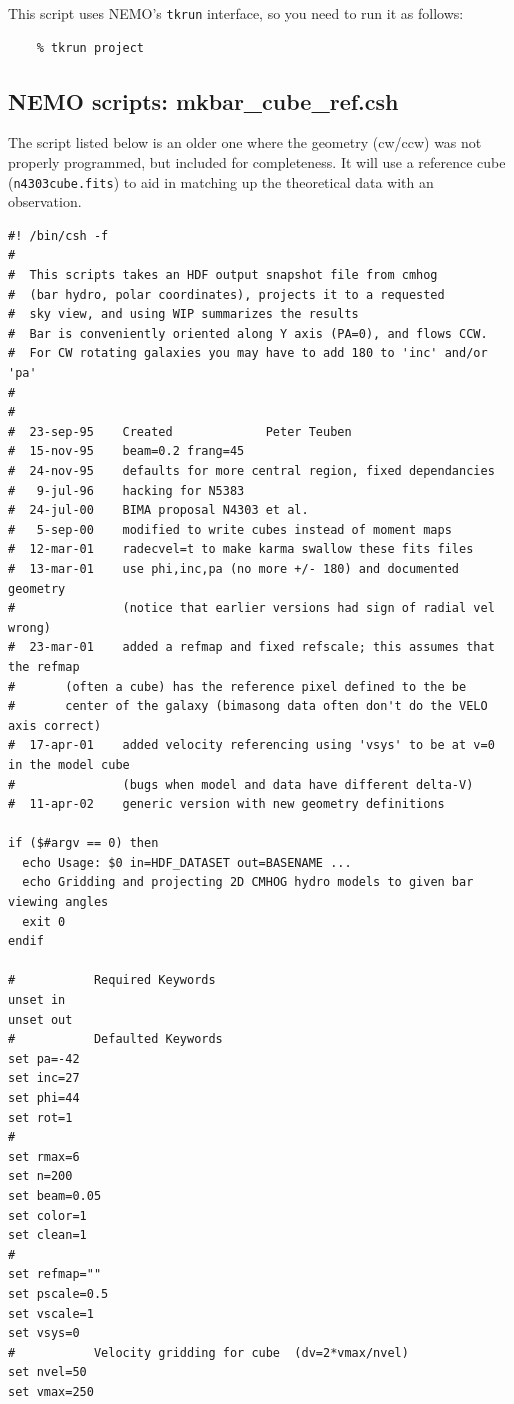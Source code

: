 \documentclass[10pt,dvips]{article}
\begin{document}
This script uses NEMO's {\tt tkrun} interface, so you need to run it
as follows:

\footnotesize\begin{verbatim}
    % tkrun project
\end{verbatim}\normalsize

\subsection{NEMO scripts: mkbar\_cube\_ref.csh}

The script listed below is an older one where the geometry (cw/ccw) was not 
properly programmed, but included for completeness. It will use a reference
cube ({\tt n4303cube.fits}) to aid in matching up the theoretical data with
an observation.

\footnotesize\begin{verbatim}
#! /bin/csh -f
#
#  This scripts takes an HDF output snapshot file from cmhog
#  (bar hydro, polar coordinates), projects it to a requested
#  sky view, and using WIP summarizes the results
#  Bar is conveniently oriented along Y axis (PA=0), and flows CCW.
#  For CW rotating galaxies you may have to add 180 to 'inc' and/or 'pa'
#
#
#  23-sep-95	Created				Peter Teuben
#  15-nov-95    beam=0.2 frang=45
#  24-nov-95    defaults for more central region, fixed dependancies
#   9-jul-96    hacking for N5383 
#  24-jul-00    BIMA proposal N4303 et al.
#   5-sep-00    modified to write cubes instead of moment maps
#  12-mar-01    radecvel=t to make karma swallow these fits files
#  13-mar-01    use phi,inc,pa (no more +/- 180) and documented geometry
#               (notice that earlier versions had sign of radial vel wrong)
#  23-mar-01    added a refmap and fixed refscale; this assumes that the refmap
#		(often a cube) has the reference pixel defined to the be 
#		center of the galaxy (bimasong data often don't do the VELO axis correct)
#  17-apr-01    added velocity referencing using 'vsys' to be at v=0 in the model cube
#               (bugs when model and data have different delta-V)
#  11-apr-02    generic version with new geometry definitions

if ($#argv == 0) then
  echo Usage: $0 in=HDF_DATASET out=BASENAME ...
  echo Gridding and projecting 2D CMHOG hydro models to given bar viewing angles
  exit 0
endif

# 			Required Keywords
unset in
unset out
# 			Defaulted Keywords
set pa=-42
set inc=27
set phi=44
set rot=1
#
set rmax=6
set n=200
set beam=0.05
set color=1
set clean=1
#
set refmap=""
set pscale=0.5
set vscale=1
set vsys=0
#			Velocity gridding for cube  (dv=2*vmax/nvel)
set nvel=50
set vmax=250


\end{verbatim}
\end{document}
